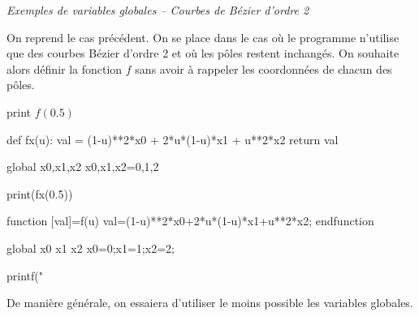 \documentclass[10pt]{article}
\begin{document}
\begin{exemple}
\textit{Exemples de variables globales -- Courbes de Bézier d'ordre 2}

On reprend le cas précédent. On se place dans le cas où le programme n'utilise que des courbes Bézier d'ordre 2 et où les pôles restent inchangés. On souhaite alors définir la fonction $f$ sans avoir à rappeler les coordonnées de chacun des pôles.

 

\begin{pseudo}
\begin{algorithm}[H]
print $f(0.5)$
\end{algorithm}
\end{pseudo}

\begin{minipage}[c]{.48\linewidth}
\begin{py}
\begin{python}
def fx(u):
    val = (1-u)**2*x0 + 2*u*(1-u)*x1 + u**2*x2
    return val
    
global x0,x1,x2
x0,x1,x2=0,1,2

print(fx(0.5))  
\end{python}
\end{py}
\end{minipage}\hfill
\begin{minipage}[c]{.48\linewidth}
\begin{sci}
\begin{scilab}
function [val]=f(u)
  val=(1-u)**2*x0+2*u*(1-u)*x1+u**2*x2;
endfunction

global x0 x1 x2
x0=0;x1=1;x2=2;

printf("%
\end{scilab}
\end{sci}
\end{minipage}
\end{exemple}

\begin{rem}
De manière générale, on essaiera d'utiliser le moins possible les variables globales.
\end{rem}

\end{document}
